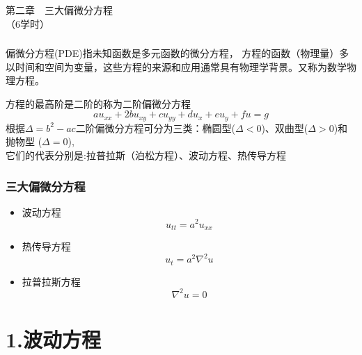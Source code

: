 	\begin{frame}
		\frametitle{}
		\Background[1] 
	    \begin{center}
		{ {\Huge 第二章~~三大偏微分方程\\（6学时）}}
	    \end{center}    
	\end{frame}

\begin{frame}
	\frametitle{}
	\begin{definition}[] 
	偏微分方程(PDE)指未知函数是多元函数的微分方程，
	方程的函数（物理量）多以时间和空间为变量，这些方程的来源和应用通常具有物理学背景。又称为数学物理方程。
	\end{definition}
	方程的最高阶是二阶的称为二阶偏微分方程
	\begin{equation*}
		au_{xx}+2bu_{xy}+cu_{yy}+du_x+eu_y+fu=g
	\end{equation*}
	根据$\Delta=b^2-ac$二阶偏微分方程可分为三类：椭圆型($\Delta<0$)、双曲型($\Delta>0$)和 抛物型 ($\Delta=0$),\\
	它们的代表分别是:拉普拉斯（泊松方程）、波动方程、热传导方程
\end{frame}

\begin{frame}
\frametitle{三大偏微分方程}
	\begin{itemize}
	\item  波动方程 
	\begin{equation*}
		u_{tt}=a^2u_{xx}
	\end{equation*}
	\item  热传导方程
	\begin{equation*}
		u_t=a^2 \nabla ^2 u 
	\end{equation*}
	\item  拉普拉斯方程
	\begin{equation*}
		 \nabla ^2 u =0
	\end{equation*}
	\end{itemize}
\end{frame}

\section{1.波动方程}
